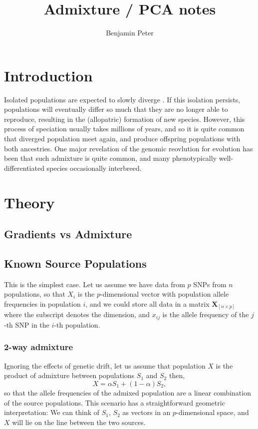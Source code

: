 \documentclass[12pt,fullpage, a4paper]{article}
\author{Benjamin Peter}
\title{Admixture / PCA notes}
\newcommand{\MX}{\mathbf{X}} %
\begin{document}
	\maketitle
	\section{Introduction}
	Isolated populations are expected to slowly diverge \citep{nielsen2001}. If this isolation persists, populations will eventually differ so much that they are no longer able to reproduce, resulting in the (allopatric) formation of new species. However, this process  of speciation usually takes millions of years, and so it is quite common that diverged population meet again, and produce offspring populations with both ancestries. One major revelation of the genomic reovlution for evolution has been that such admixture is quite common, and many phenotypically well-differentiated species occasionally interbreed.
	
	
\section{Theory}
\subsection{Gradients vs Admixture}


\subsection{Known Source Populations}
This is the simplest case. Let us assume we have data from $p$ SNPs from $n$ populations, so that $X_i$ is the $p$-dimensional vector with population allele frequencies in population $i$, and we could store all data in a matrix $\MX_{[n \times p]}$ where the subscript denotes the dimension, and $x_{ij}$ is the allele frequency of the $j$-th SNP in the $i$-th population.   


\subsubsection{2-way admixture}
Ignoring the effects of genetic drift, let us assume that population $X$ is the product of admixture between populations $S_1$ and $S_2$ then,
\begin{equation}
X = \alpha S_1 + (1-\alpha) S_2,
\end{equation}
so that the allele frequencies of the admixed population are a linear combination of the source populations. This scenario has a straightforward geometric interpretation: We can think of $S_1$, $S_2$ as vectors in an $p$-dimensional space, and $X$ will lie on the line between the two sources. 
\end{document}
